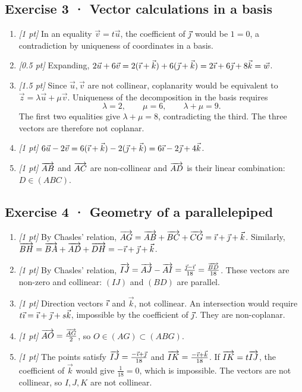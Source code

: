 \subsection*{Exercise 3 · Vector calculations in a basis}\begin{enumerate}

\item \textit{[1 pt]} In an equality $\vec v=t\vec u$, the coefficient of $\vec{\jmath} $ would be $1=0$, a contradiction by uniqueness of coordinates in a basis.

\item \textit{[0.5 pt]} Expanding, $2\vec u+6\vec v=2(\vec{\imath} +\vec k)+6(\vec{\jmath} +\vec k)=2\vec{\imath} +6\vec{\jmath} +8\vec k=\vec w$.

\item \textit{[1.5 pt]} Since $\vec u,\vec v$ are not collinear, coplanarity would be equivalent to $\vec z=\lambda\vec u+\mu\vec v$. Uniqueness of the decomposition in the basis requires
\[\lambda=2,\qquad\mu=6,\qquad\lambda+\mu=9.\]
The first two equalities give $\lambda+\mu=8$, contradicting the third. The three vectors are therefore not coplanar.

\item \textit{[1 pt]} $6\vec u-2\vec v=6(\vec{\imath} +\vec k)-2(\vec{\jmath} +\vec k)=6\vec{\imath} -2\vec{\jmath} +4\vec k$.

\item \textit{[1 pt]} $\overrightarrow{AB}$ and $\overrightarrow{AC}$ are non-collinear and $\overrightarrow{AD}$ is their linear combination: $D\in(ABC)$.

\end{enumerate}

\subsection*{Exercise 4 · Geometry of a parallelepiped}\begin{enumerate}

\item \textit{[1 pt]} By Chasles' relation, $\overrightarrow{AG}=\overrightarrow{AB}+\overrightarrow{BC}+\overrightarrow{CG}=\vec{\imath} +\vec{\jmath} +\vec k$. Similarly, $\overrightarrow{BH}=\overrightarrow{BA}+\overrightarrow{AD}+\overrightarrow{DH}=-\vec{\imath} +\vec{\jmath} +\vec k$.

\item \textit{[1 pt]} By Chasles' relation, $\overrightarrow{IJ}=\overrightarrow{AJ}-\overrightarrow{AI}=\frac{\vec{\jmath} -\vec{\imath} }{18}=\frac{\overrightarrow{BD}}{18}$. These vectors are non-zero and collinear: $(IJ)$ and $(BD)$ are parallel.

\item \textit{[1 pt]} Direction vectors $\vec{\imath} $ and $\vec k$, not collinear. An intersection would require $t\vec{\imath} =\vec{\imath} +\vec{\jmath} +s\vec k$, impossible by the coefficient of $\vec{\jmath} $. They are non-coplanar.

\item \textit{[1 pt]} $\overrightarrow{AO}=\frac{\overrightarrow{AG}}{2}$, so $O\in(AG)\subset(ABG)$.

\item \textit{[1 pt]} The points satisfy $\overrightarrow{IJ}=\frac{-\vec{\imath} +\vec{\jmath} }{18}$ and $\overrightarrow{IK}=\frac{-\vec{\imath} +\vec k}{18}$. If $\overrightarrow{IK}=t\overrightarrow{IJ}$, the coefficient of $\vec k$ would give $\frac{1}{18}=0$, which is impossible. The vectors are not collinear, so $I,J,K$ are not collinear.

\end{enumerate}

